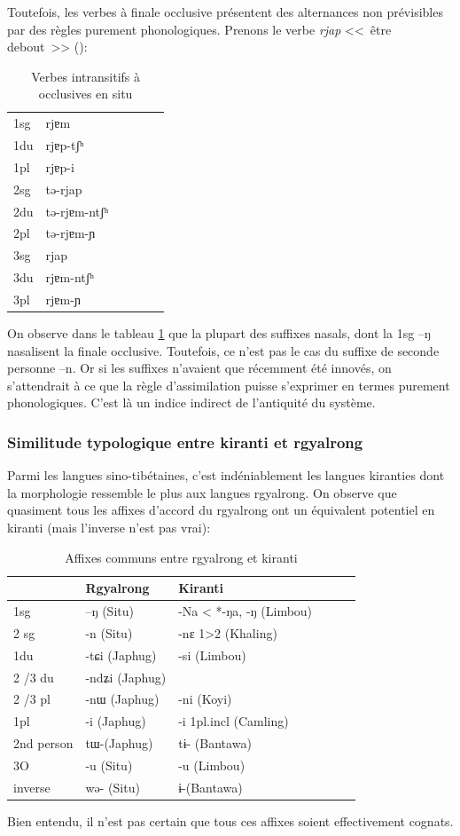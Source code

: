 \documentclass[oldfontcommands,oneside,a4paper,11pt]{memoir}
\begin{document}
Toutefois, les verbes à finale occlusive présentent des alternances non prévisibles par des règles purement phonologiques. Prenons le verbe \textit{rjap} <<~être debout~>> (\citealt[207]{linxr93jiarong}):
\begin{table}[H]
\caption{Verbes intransitifs à occlusives en situ }\label{tab:situ2} \centering
\begin{tabular}{llllll} 
1sg &	rjɐm  \\
1du &	rjɐp-tʃʰ \\
1pl &	rjɐp-i \\
2sg &	tə-rjap \\
2du &	tə-rjɐm-ntʃʰ \\
2pl &	tə-rjɐm-ɲ \\
3sg &	rjap \\
3du &	rjɐm-ntʃʰ \\
3pl &	rjɐm-ɲ \\
\end{tabular}
\end{table}
On observe dans le tableau \ref{tab:situ2} que la plupart des suffixes nasals, dont la 1sg --ŋ nasalisent la finale occlusive. Toutefois, ce n'est pas le cas du suffixe de seconde personne --n. Or si les suffixes n'avaient que récemment été innovés, on s'attendrait à ce que la règle d'assimilation puisse s'exprimer en termes purement phonologiques. C'est là un indice indirect de l'antiquité du système.
\subsubsection{Similitude typologique entre kiranti et rgyalrong}

Parmi les langues sino-tibétaines, c'est indéniablement les langues kiranties dont la morphologie ressemble le plus aux langues rgyalrong. On observe que quasiment tous les affixes d'accord du rgyalrong ont un équivalent potentiel en kiranti (mais l'inverse n'est pas vrai):
\begin{table}[H]
\caption{Affixes communs entre rgyalrong et kiranti}\label{tab:rgyalrong.kiranti} \centering
\begin{tabular}{llllll} 
\toprule
    &	Rgyalrong   &	Kiranti   \\	
    \midrule
1sg   &	–ŋ (Situ)   &	-Na < *-ŋa, -ŋ (Limbou)   \\	
2 sg   &	-n (Situ)   &	-nɛ 1>2 (Khaling)   \\	
1du   &	-tɕi (Japhug)   &	-si (Limbou)   \\	
2 /3 du   &	-ndʑi (Japhug)   &	   \\	
2 /3 pl   &	-nɯ (Japhug)   &	-ni (Koyi)   \\	
1pl   &	-i (Japhug)   &	-i 1pl.incl (Camling)   \\	
2nd person   &	tɯ-(Japhug)   &	tɨ- (Bantawa)   \\	
3O   &	-u (Situ)   &	-u (Limbou)   \\	
inverse   &	wə- (Situ)   &	ɨ-(Bantawa)   \\	
\bottomrule
\end{tabular}
\end{table}
Bien entendu, il n'est pas certain que tous ces affixes soient effectivement cognats.
\end{document}
